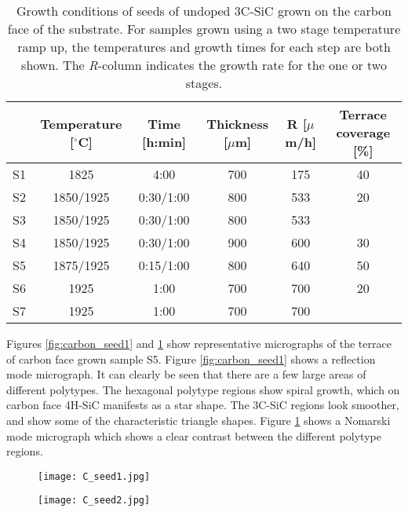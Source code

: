 \begin{table}[h]
\small
\caption{Growth conditions of seeds of undoped 3C-SiC grown on the carbon face of the substrate. For samples grown using a two stage temperature ramp up, the temperatures and growth times for each step are both shown. The \emph{R}-column indicates the growth rate for the one or two stages.}
\label{tab:seeds}
\begin{center}
\begin{tabular}{l c c c c c}
  \hline                       
  \hline       
  \vspace{1mm}
   & \small{Temperature [$^\circ$C]} & \small{Time [h:min]} & \small{Thickness [$\mu$m]} & R [$\mu$m/h] &\small{Terrace coverage [\%]}\\
    \hline
  S1 & 1825 & 4:00 & 700 & 175 & 40\\
  S2 & 1850/1925 & 0:30/1:00 & 800 & 533 &20\\
  S3 & 1850/1925 & 0:30/1:00 & 800 & 533 &\\
  S4 & 1850/1925 & 0:30/1:00 & 900 & 600 &30\\
  S5 & 1875/1925 & 0:15/1:00 & 800 & 640 & 50\\
  S6 & 1925 & 1:00 & 700 & 700 & 20\\
  S7 & 1925 & 1:00 & 700 & 700 &\\
  \hline  
\end{tabular}
\end{center}
\end{table}


Figures \ref{fig:carbon_seed1} and \ref{fig:carbon_seed2} show representative micrographs of the terrace of carbon face grown sample S5. Figure \ref{fig:carbon_seed1} shows a reflection mode micrograph. It can clearly be seen that there are a few large areas of different polytypes. The hexagonal polytype regions show spiral growth, which on carbon face 4H-SiC manifests as a star shape. The 3C-SiC regions look smoother, and show some of the characteristic triangle shapes. Figure \ref{fig:carbon_seed2} shows a Nomarski mode micrograph which shows a clear contrast between the different polytype regions. 

\begin{figure}[h]
\centering
\begin{minipage}{.5\textwidth}
  \centering
  \texttt{[image: C\_seed1.jpg]}
  \label{fig:carbon_seed1}
\end{minipage}%
\begin{minipage}{.5\textwidth}
  \centering
  \texttt{[image: C\_seed2.jpg]}
  \label{fig:carbon_seed2}
\end{minipage}
\end{figure}

